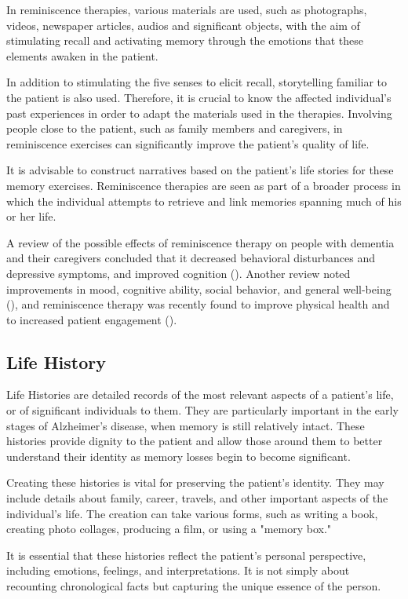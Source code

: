In reminiscence therapies, various materials are used, such as photographs, videos, newspaper articles, audios and significant objects, with the aim of stimulating recall and activating memory through the emotions that these elements awaken in the patient.

In addition to stimulating the five senses to elicit recall, storytelling familiar to the patient is also used. Therefore, it is crucial to know the affected individual's past experiences in order to adapt the materials used in the therapies. Involving people close to the patient, such as family members and caregivers, in reminiscence exercises can significantly improve the patient's quality of life.

It is advisable to construct narratives based on the patient's life stories for these memory exercises. Reminiscence therapies are seen as part of a broader process in which the individual attempts to retrieve and link memories spanning much of his or her life.

A review of the possible effects of reminiscence therapy on people with dementia and their caregivers concluded that it decreased behavioral disturbances and depressive symptoms, and improved cognition (\cite{huang2015reminiscence}). Another review noted improvements in mood, cognitive ability, social behavior, and general well-being (\cite{cotelli2012reminiscence}), and reminiscence therapy was recently found to improve physical health and to
increased patient engagement (\cite{irazoki2027eficacia}).
\subsection{Life History}
Life Histories are detailed records of the most relevant aspects of a patient's life, or of significant individuals to them. They are particularly important in the early stages of Alzheimer's disease, when memory is still relatively intact. These histories provide dignity to the patient and allow those around them to better understand their identity as memory losses begin to become significant.

Creating these histories is vital for preserving the patient's identity. They may include details about family, career, travels, and other important aspects of the individual's life. The creation can take various forms, such as writing a book, creating photo collages, producing a film, or using a "memory box."

It is essential that these histories reflect the patient's personal perspective, including emotions, feelings, and interpretations. It is not simply about recounting chronological facts but capturing the unique essence of the person.

